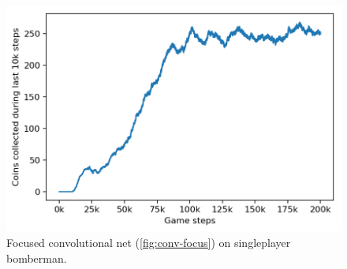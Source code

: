 
\begin{figure}
  \centering
    	\includegraphics[width=0.6\linewidth]{images/fullgame-singleplayer.png}
  \caption{Focused convolutional net (\ref{fig:conv-focus}) on singleplayer bomberman.}
  \label{fig:fullcrate}
\end{figure}

